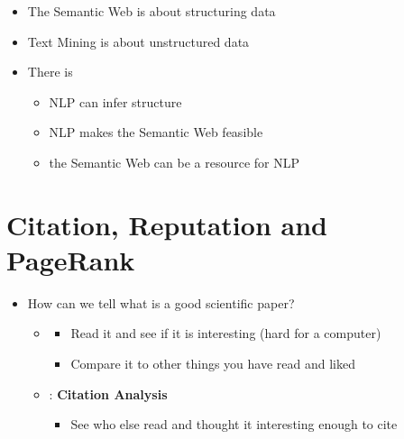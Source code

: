 \documentclass[a4paper,landscape,headrule,footrule,xetex]{foils}
\begin{document}
\MyLogo{}
\begin{itemize}
\item The Semantic Web is about structuring data
\item Text Mining is about unstructured data
\item There is 
  \begin{itemize}
  \item NLP can infer structure
  \item NLP makes the Semantic Web feasible
  \item the Semantic Web can be a resource for NLP
  \end{itemize}
\end{itemize}





\section{Citation, Reputation and PageRank}


\begin{itemize}
\item How can we tell what is a good scientific paper?
  \begin{itemize}
    \item {}
    \begin{itemize}
    \item Read it and see if it is interesting (hard for a computer)
    \item Compare it to other things you have read and liked
    \end{itemize}
  \item     {}: \textbf{Citation Analysis}
    \begin{itemize}
    \item See who else read and thought it interesting enough to cite
    \end{itemize}
  \end{itemize}
\end{itemize}

\end{document}
